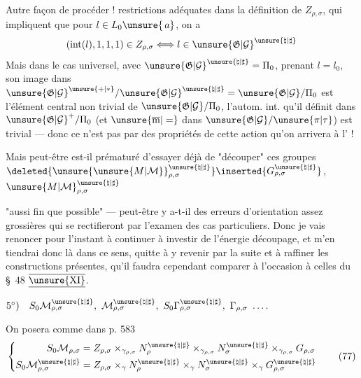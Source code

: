Autre façon de procéder !
  restrictions adéquates dans
la définition de $Z_{\rho,\sigma}$, qui
impliquent que
pour $l\in L_0\unsure{\,a}$, on a
\[
(\mathrm{int}(l),1,1,1)\in Z_{\rho,\sigma}
\Longleftrightarrow
l\in\unsure{\mathfrak{G}|\mathcal{G}}^{\unsure{\natural|\sharp}}
\]
Mais dans le cas universel, avec
$\unsure{\mathfrak{G}|\mathcal{G}}^{\unsure{\natural|\sharp}}=\Pi_0$,
prenant $l=l_0$, son image dans
$\unsure{\mathfrak{G}|\mathcal{G}}^{\unsure{+|*}}/
\unsure{\mathfrak{G}|\mathcal{G}}^{\unsure{\natural|\sharp}}
=\unsure{\mathfrak{G}|\mathcal{G}}/\Pi_0$
est l'élément central non trivial de
$\unsure{\mathfrak{G}|\mathcal{G}}/\Pi_0$,
l'autom. int. qu'il définit dans
$\unsure{\mathfrak{G}|\mathcal{G}}^+/\Pi_0$
(et $\unsure{\overline{\mathrm m}|=}$ dans
$\unsure{\mathfrak{G}|\mathcal{G}}/\unsure{\pi|\tau}$)
est trivial --- donc ce n'est pas par
 des propriétés de cette action
qu'on arrivera à l' !

Mais peut-être est-il prématuré d'essayer déjà de "découper" ces groupes
$\deleted{\unsure{\unsure{M|\mathcal{M}}}_{\rho,\sigma}^{\unsure{\natural|\sharp}}}
\inserted{G_{\rho,\sigma}^{\unsure{\natural|\sharp}}}$,
$\unsure{M|\mathcal{M}}_{\rho,\sigma}^{\unsure{\natural|\sharp}}$



"aussi fin que possible" --- peut-être y a-t-il
 des erreurs d'orientation assez grossières qui
se rectifieront par l'examen des cas
particuliers. Donc je vais renoncer
pour l'instant à continuer à investir 
de l'énergie  découpage, et m'en
tiendrai donc là dans ce sens, quitte
à y revenir par la suite et à raffiner
les constructions présentes, qu'il faudra
cependant comparer à l'occasion à celles
du \S~48 $\overline{\underline{\unsure{\mathrm{XI}}}}$.




$5^\circ)\quad S_0\mathcal{M}_{\rho,\sigma}^{\unsure{\natural|\sharp}},\ \mathcal{M}_{\rho,\sigma}^{\unsure{\natural|\sharp}},\ S_0\Gamma_{\rho,\sigma}^{\unsure{\natural|\sharp}},\ \Gamma_{\rho,\sigma}\ \ldots .$

On posera comme dans p. 583
\[
\left\{\begin{aligned}
S_0\mathcal{M}_{\rho,\sigma}
 &= Z_{\rho,\sigma}\times_{\gamma_{\rho,\sigma}}N_\rho^{\unsure{\natural|\sharp}}
 \times_{\gamma_{\rho,\sigma}}N_\sigma^{\unsure{\natural|\sharp}}
 \times_{\gamma_{\rho,\sigma}}G_{\rho,\sigma}\\
S_0\mathcal{M}_{\rho,\sigma}^{\unsure{\natural|\sharp}}
 &= Z_{\rho,\sigma}\times_\gamma N_\rho^{\unsure{\natural|\sharp}}
 \times_\gamma N_\sigma^{\unsure{\natural|\sharp}}\times_\gamma G_{\rho,\sigma}^{\unsure{\natural|\sharp}}
\end{aligned}\right.
\tag{77}
\]

